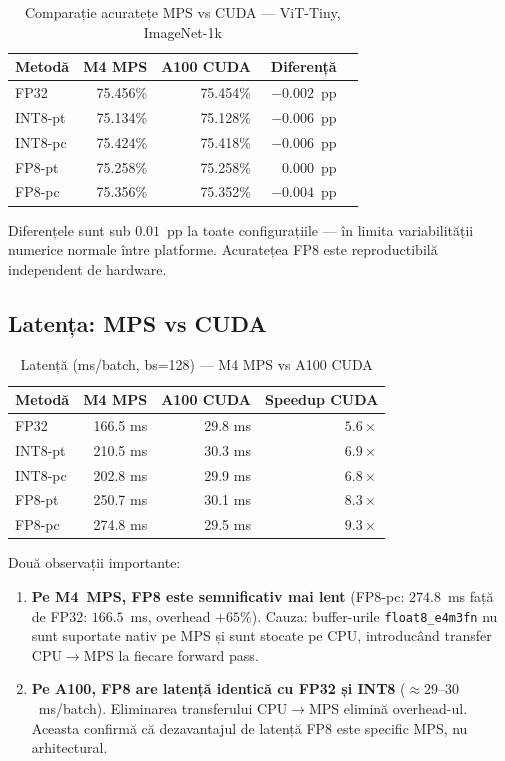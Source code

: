 \documentclass[12pt,a4paper]{article}
\begin{document}
\begin{table}[H]
  \centering
  \caption{Comparație acuratețe MPS vs CUDA --- ViT-Tiny, ImageNet-1k}
  \begin{tabular}{lrrrr}
    \toprule
    \textbf{Metodă} & \textbf{M4 MPS} & \textbf{A100 CUDA} & \textbf{Diferență} \\
    \midrule
    FP32    & 75.456\% & 75.454\% & $-0.002$~pp \\
    INT8-pt & 75.134\% & 75.128\% & $-0.006$~pp \\
    INT8-pc & 75.424\% & 75.418\% & $-0.006$~pp \\
    FP8-pt  & 75.258\% & 75.258\% & $\phantom{-}0.000$~pp \\
    FP8-pc  & 75.356\% & 75.352\% & $-0.004$~pp \\
    \bottomrule
  \end{tabular}
  \label{tab:mps_vs_cuda_acc}
\end{table}

Diferențele sunt sub $0.01$~pp la toate configurațiile ---
în limita variabilității numerice normale între platforme.
Acuratețea FP8 este reproductibilă independent de hardware.

\subsection{Latența: MPS vs CUDA}

\begin{table}[H]
  \centering
  \caption{Latență (ms/batch, bs=128) --- M4 MPS vs A100 CUDA}
  \begin{tabular}{lrrr}
    \toprule
    \textbf{Metodă} & \textbf{M4 MPS} & \textbf{A100 CUDA} & \textbf{Speedup CUDA} \\
    \midrule
    FP32    & 166.5 ms & 29.8 ms & $5.6\times$ \\
    INT8-pt & 210.5 ms & 30.3 ms & $6.9\times$ \\
    INT8-pc & 202.8 ms & 29.9 ms & $6.8\times$ \\
    FP8-pt  & 250.7 ms & 30.1 ms & $8.3\times$ \\
    FP8-pc  & 274.8 ms & 29.5 ms & $9.3\times$ \\
    \bottomrule
  \end{tabular}
  \label{tab:mps_vs_cuda_lat}
\end{table}

Două observații importante:
\begin{enumerate}
  \item \textbf{Pe M4~MPS, FP8 este semnificativ mai lent} (FP8-pc: $274.8$~ms
    față de FP32: $166.5$~ms, overhead $+65\%$). Cauza: buffer-urile
    \texttt{float8\_e4m3fn} nu sunt suportate nativ pe MPS și sunt stocate
    pe CPU, introducând transfer CPU$\to$MPS la fiecare forward pass.
  \item \textbf{Pe A100, FP8 are latență identică cu FP32 și INT8} ($\approx
    29$--$30$~ms/batch). Eliminarea transferului CPU$\to$MPS elimină overhead-ul.
    Aceasta confirmă că dezavantajul de latență FP8 este specific MPS, nu
    arhitectural.
\end{enumerate}
\end{document}
